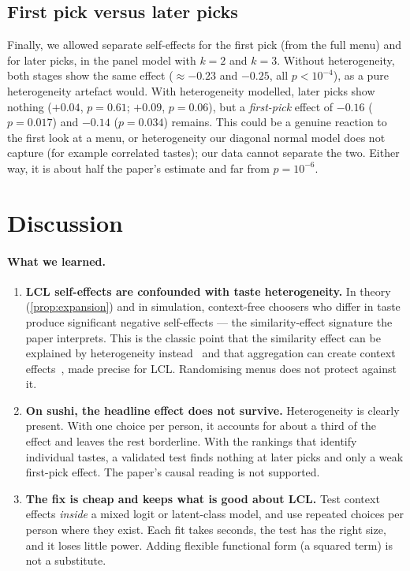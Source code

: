 \documentclass[11pt,a4paper]{article}
\theoremstyle{remark}
\begin{document}
\subsection{First pick versus later picks}

Finally, we allowed separate self-effects for the first pick (from the full menu) and for later picks,
in the panel model with $k=2$ and $k=3$. Without heterogeneity, both stages show the same effect
($\approx-0.23$ and $-0.25$, all $p<10^{-4}$), as a pure heterogeneity artefact would. With heterogeneity
modelled, later picks show nothing ($+0.04$, $p=0.61$; $+0.09$, $p=0.06$), but a \emph{first-pick} effect
of $-0.16$ ($p=0.017$) and $-0.14$ ($p=0.034$) remains. This could be a genuine reaction to the first
look at a menu, or heterogeneity our diagonal normal model does not capture (for example correlated
tastes); our data cannot separate the two. Either way, it is about half the paper's estimate and far from
$p=10^{-6}$.

\section{Discussion}
\label{sec:discussion}

\paragraph{What we learned.}
\begin{enumerate}
\item \textbf{LCL self-effects are confounded with taste heterogeneity.} In theory
      (\cref{prop:expansion}) and in simulation, context-free choosers who differ in taste produce
      significant negative self-effects --- the similarity-effect signature the paper interprets. This is
      the classic point that the similarity effect can be explained by heterogeneity
      instead~\cite{tversky72,mcfadden00} and that aggregation can create context
      effects~\cite{hkl00,lhl16}, made precise for LCL. Randomising menus does not protect against it.
\item \textbf{On sushi, the headline effect does not survive.} Heterogeneity is clearly present. With one
      choice per person, it accounts for about a third of the effect and leaves the rest borderline. With
      the rankings that identify individual tastes, a validated test finds nothing at later picks and only a
      weak first-pick effect. The paper's causal reading is not supported.
\item \textbf{The fix is cheap and keeps what is good about LCL.} Test context effects \emph{inside} a
      mixed logit or latent-class model, and use repeated choices per person where they exist. Each fit
      takes seconds, the test has the right size, and it loses little power. Adding flexible functional
      form (a squared term) is not a substitute.
\end{enumerate}
\end{document}
